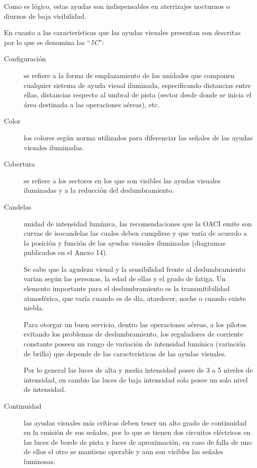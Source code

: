 Como es lógico, estas ayudas son indispensables en aterrizajes
nocturnos o diurnos de baja visibilidad.

En cuanto a las características que las ayudas visuales  presentan son  descritas
por lo que se denomina las ``\emph{5C}'': 

\begin{description}
  
\item [Configuración] se refiere a la forma de emplazamiento de las
unidades que componen cualquier sistema de ayuda visual iluminada, especificando distancias
entre ellas, distancias respecto al umbral de pista (sector desde donde se inicia el área destinada a
las operaciones aéreas), etc.

\item[Color] los colores según norma utilizados para diferenciar las señales de las ayudas visuales iluminadas.

\item[Cobertura] se refiere a los sectores en los que son visibles las ayudas visuales iluminadas y a la reducción del
  deslumbramiento.
  
\item[Candelas] unidad de intensidad lumínica, las recomendaciones que la OACI emite son
curvas de isocandelas las cuales deben cumplirse y que varía de acuerdo a la posición y función
de las ayudas visuales iluminadas (diagramas publicados en el Anexo 14).

Se sabe que la agudeza visual y la sensibilidad frente al deslumbramiento varían según las
personas, la edad de ellas y el grado de fatiga.  Un elemento importante para el deslumbramiento
es la transmitibilidad atmosférica, que varía cuando es de día, atardecer, noche o cuando
existe niebla.

Para otorgar un buen servicio, dentro las operaciones aéreas, a los pilotos evitando los
problemas de deslumbramiento, los reguladores de corriente constante poseen un rango de
variación de intensidad lumínica (variación de brillo) que depende de las características de las
ayudas visuales.

Por lo general las luces de alta y media intensidad posee de 3 a 5 niveles de intensidad, en cambio
las luces de baja intensidad solo posee un solo nivel de intensidad.

\item[Continuidad] las ayudas visuales más críticas deben tener un alto grado de continuidad en la
emisión de sus señales, por lo que se tienen dos circuitos eléctricos en las luces de borde de pista
y luces de aproximación, en caso de falla de uno de ellos el otro se mantiene operable y aun son
visibles las señales luminosas.

\end{description}




